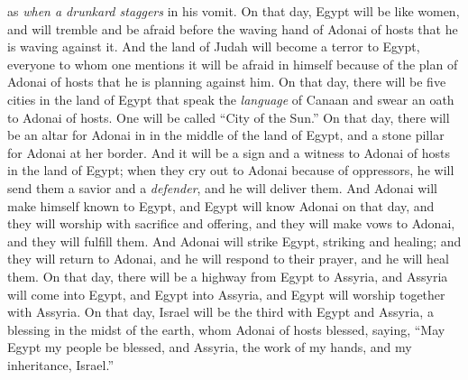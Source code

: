 \begin{biblechapter}
as \textit{when a drunkard staggers} in his vomit.
 On that day, Egypt will be like women, and will tremble and be afraid before the waving hand of Adonai of hosts that he is waving against it.
\verse And the land of Judah will become a terror to Egypt, everyone to whom one mentions it will be afraid in himself because of the plan of Adonai of hosts that he is planning against him.
\verse On that day, there will be five cities in the land of Egypt that speak the \textit{language} of Canaan and swear an oath to Adonai of hosts. One will be called “City of the Sun.”
\verse On that day, there will be an altar for Adonai in in the middle of the land of Egypt, and a stone pillar for Adonai at her border.
\verse And it will be a sign and a witness to Adonai of hosts in the land of Egypt; when they cry out to Adonai because of oppressors, he will send them a savior and a \textit{defender}, and he will deliver them.
\verse And Adonai will make himself known to Egypt, and Egypt will know Adonai on that day, and they will worship with sacrifice and offering, and they will make vows to Adonai, and they will fulfill them.
\verse And Adonai will strike Egypt, striking and healing; and they will return to Adonai, and he will respond to their prayer, and he will heal them.
\verse On that day, there will be a highway from Egypt to Assyria, and Assyria will come into Egypt, and Egypt into Assyria, and Egypt will worship together with Assyria.
\verse On that day, Israel will be the third with Egypt and Assyria, a blessing in the midst of the earth,
\verse whom Adonai of hosts blessed, saying, “May Egypt my people be blessed, and Assyria, the work of my hands, and my inheritance, Israel.”
\end{biblechapter}

